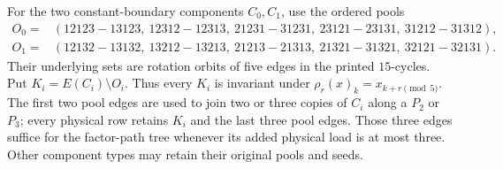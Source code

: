 
For the two constant-boundary components $C_0,C_1$, use the ordered pools
\[
\begin{split}
O_0={}&(12123\!-13123,\ 12312\!-12313,\ 21231\!-31231,
          \ 23121\!-23131,\ 31212\!-31312),\\
O_1={}&(12132\!-13132,\ 13212\!-13213,\ 21213\!-21313,
          \ 21321\!-31321,\ 32121\!-32131).
\end{split}
\]
Their underlying sets are rotation orbits of five edges in the printed
$15$-cycles. Put $K_i=E(C_i)\setminus O_i$. Thus every $K_i$ is invariant
under $\rho_r(x)_k=x_{k+r\pmod5}$. The first two pool edges are used to
join two or three copies of $C_i$ along a $P_2$ or $P_3$; every physical
row retains $K_i$ and the last three pool edges. Those three edges suffice
for the factor-path tree whenever its added physical load is at most three.
Other component types may retain their original pools and seeds.

